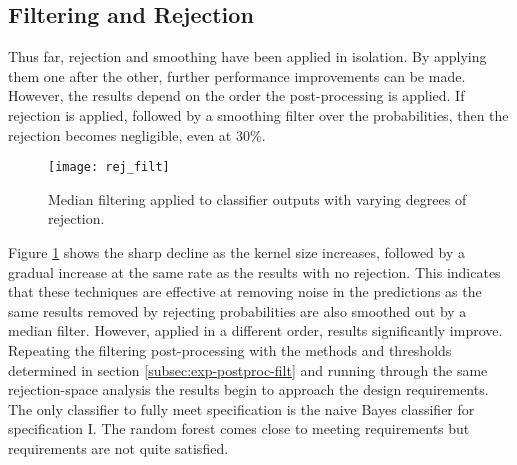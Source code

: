     \subsection{Filtering and Rejection}
    \label{subsec:exp-postproc-filtrej}
        Thus far, rejection and smoothing have been applied in isolation. By applying them one after the other, further performance improvements can be made. However, the results depend on the order the post-processing is applied. If rejection is applied, followed by a smoothing filter over the probabilities, then the rejection becomes negligible, even at $30\%$. 
        \begin{figure}[ht]
            \centering
            \texttt{[image: rej\_filt]}
            \caption{Median filtering applied to classifier outputs with varying degrees of rejection.}
            \label{fig:exp-postproc-rejfilt}
        \end{figure}
        Figure \ref{fig:exp-postproc-rejfilt} shows the sharp decline as the kernel size increases, followed by a gradual increase at the same rate as the results with no rejection. This indicates that these techniques are effective at removing noise in the predictions as the same results removed by rejecting probabilities are also smoothed out by a median filter. However, applied in a different order, results significantly improve. Repeating the filtering post-processing with the methods and thresholds determined in section \ref{subsec:exp-postproc-filt} and running through the same rejection-space analysis the results begin to approach the design requirements. The only classifier to fully meet specification is the naive Bayes classifier for specification I. The random forest comes close to meeting requirements but requirements are not quite satisfied. 
        
